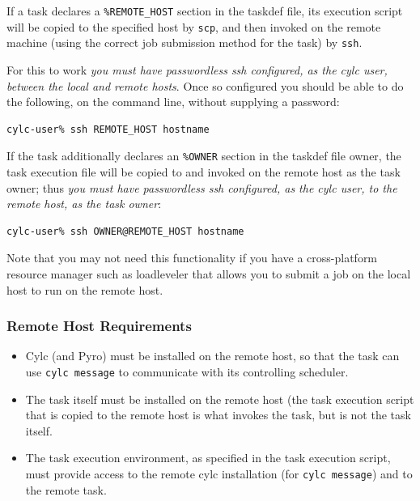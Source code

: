 \documentclass[11pt,a4paper]{article}
\begin{document}
If a task declares a \lstinline=%REMOTE_HOST= section in the taskdef
file, its execution script will be copied to the specified host by 
\lstinline=scp=, and then invoked on the remote machine (using the
correct job submission method for the task) by \lstinline=ssh=. 

For this to work {\em you must have passwordless ssh configured, as 
the cylc user, between the local and remote hosts}. Once so configured
you should be able to do the following, on the command line, without
supplying a password:

\begin{lstlisting}
cylc-user% ssh REMOTE_HOST hostname
\end{lstlisting}

If the task additionally declares an \lstinline=%OWNER= section in the
taskdef file owner, the task execution file will be copied to and
invoked on the remote host as the task owner; thus {\em you must have
passwordless ssh configured, as the cylc user, to the remote host, as
the task owner}:

\begin{lstlisting}
cylc-user% ssh OWNER@REMOTE_HOST hostname
\end{lstlisting}

Note that you may not need this functionality if you have a
cross-platform resource manager such as loadleveler that allows 
you to submit a job on the local host to run on the remote host.

\subsubsection{Remote Host Requirements}

\begin{itemize}

    \item Cylc (and Pyro) must be installed on the remote host, so that 
        the task can use \lstinline=cylc message= to communicate with
        its controlling scheduler.
        
    \item The task itself must be installed on the remote host (the task
        execution script that is copied to the remote host is what
        invokes the task, but is not the task itself. 

    \item The task execution environment, as specified in the task
        execution script, must provide access to the remote cylc
        installation (for \lstinline=cylc message=) and to the remote
        task.

\end{itemize}
\end{document}
